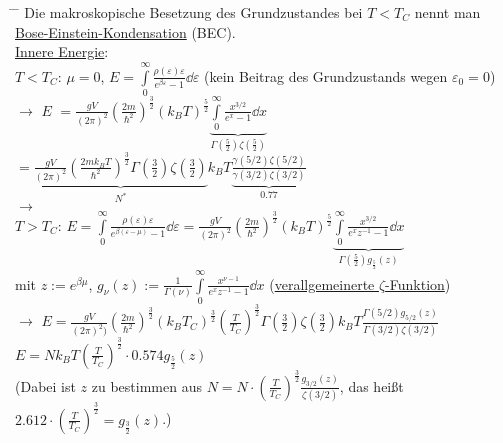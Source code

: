 \begin{tabbing}
\hspace{4em} \= \hspace{4em} \= \kill
Die makroskopische Besetzung des Grundzustandes bei $T < T_C$ nennt man\\
\underline{Bose-Einstein-Kondensation} (BEC).\\
\underline{Innere Energie}:\\
$T< T_C$:\> $\mu = 0$, $E = \int\limits_0^{\infty} \frac{\rho(\varepsilon)\varepsilon}{e^{\beta\varepsilon} - 1}\dd{\varepsilon}$ (kein Beitrag des Grundzustands wegen $\varepsilon_0 = 0$)\\
$\rightarrow$ $E$\> $= \frac{g V}{(2\pi)^2}\left(\frac{2 m}{\hbar^2}\right)^{\frac{3}{2}} (k_B T)^{\frac{5}{2}}
\underbrace{ \int\limits_0^{\infty}\frac{x^{3/2}}{e^x-1}\dd{x}}_{\Gamma\left(\frac{5}{2}\right)\zeta\left(\frac{5}{2}\right)}$\\
\> $=\underbrace{\frac{g V}{(2\pi)^2}\left(\frac{2 m k_B T}{\hbar^2}\right)^{\frac{3}{2}}\Gamma\left(\frac{3}{2}\right)\zeta\left(\frac{3}{2}\right)}_{N^{*}} k_B T\underbrace{\frac{\gamma(5/2)\zeta(5/2)}{\gamma(3/2)\zeta(3/2)}}_{0.77}$\\
$\rightarrow$\> \\
$T > T_C$:\> $E = \int\limits_0^{\infty}\frac{\rho(\varepsilon)\varepsilon}{e^{\beta (\varepsilon - \mu)} -1}\dd{\varepsilon} = \frac{g V}{(2\pi)^2}\left(\frac{2 m}{\hbar^2}\right)^{\frac{3}{2}}(k_B T)^{\frac{5}{2}}\underbrace{\int\limits_0^{\infty}\frac{x^{3/2}}{e^xz^{-1} -1}\dd{x}}_{\Gamma\left(\frac{5}{2}\right)g_{\frac{5}{2}}(z)}$\\
\> mit $z:= e^{\beta\mu}$, $g_{\nu}(z) := \frac{1}{\Gamma(\nu)}\int\limits_0^{\infty}\frac{x^{\nu -1}}{e^xz^{-1} -1}\dd{x}$ (\glqq\underline{verallgemeinerte $\zeta$-Funktion}\grqq)\\
$\rightarrow$\> $E = \frac{g V}{(2\pi)^2)}\left(\frac{2 m}{\hbar^2}\right)^{\frac{3}{2}}(k_B T_C)^{\frac{3}{2}}\left(\frac{T}{T_C}\right)^{\frac{3}{2}}\Gamma\left(\frac{3}{2}\right)\zeta\left(\frac{3}{2}\right)k_B T \frac{\Gamma(5/2)g_{5/2}(z)}{\Gamma(3/2)\zeta(3/2)}$\\
\> $E = N k_B T \left(\frac{T}{T_C}\right)^{\frac{3}{2}}\cdot 0.574 g_{\frac{5}{2}}(z)$\\
(Dabei ist $z$ zu bestimmen aus $N = N\cdot \left(\frac{T}{T_C}\right)^{\frac{3}{2}}\frac{g_{3/2}(z)}{\zeta(3/2)}$, das heißt $2.612\cdot \left(\frac{T}{T_C}\right)^{\frac{3}{2}} = g_{\frac{3}{2}}(z)$.)\\

\end{tabbing}
